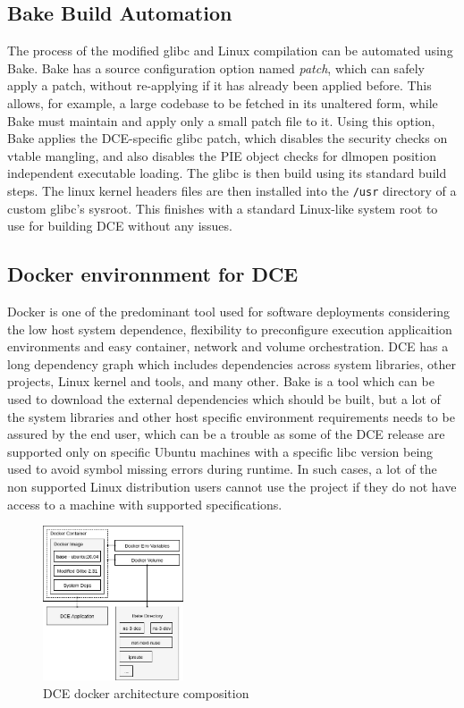 \documentclass{sig-alternate}
\begin{document}
\subsection{Bake Build Automation}

The process of the modified glibc and Linux compilation can be automated using Bake.
Bake has a source configuration option named \textit{patch}, which can safely apply a patch, without re-applying if it has already been applied before.  
This allows, for example, a large codebase to be fetched in its unaltered form, while Bake must maintain and apply only a small patch file to it.
Using this option, Bake applies the DCE-specific glibc patch, which disables the security checks on vtable mangling, and also disables the 
PIE object checks for dlmopen position independent executable loading. The glibc is then build using its standard build steps. The linux kernel headers
files are then installed into the \texttt{/usr} directory of a custom glibc's sysroot. This finishes with a standard Linux-like system root to use for building 
DCE without any issues. 


\subsection{Docker environnment for DCE}
Docker is one of the predominant tool used for software deployments considering the low host system dependence, flexibility to preconfigure execution 
applicaition environments and easy container, network and volume orchestration. DCE has a long dependency graph which includes dependencies across 
system libraries, other projects, Linux kernel and tools, and many other. Bake is a tool which can be used to download the external dependencies 
which should be built, but a lot of the system libraries and other host specific environment requirements needs to be assured by the end user, which
can be a trouble as some of the DCE release are supported only on specific Ubuntu machines with a specific libc version being used to avoid symbol 
missing errors during runtime. In such cases, a lot of the non supported Linux distribution users cannot use the project if they do not have access 
to a machine with supported specifications. 


\begin{figure}[!htb]
  \centering
    \includegraphics[width=0.37\textwidth]{figs/docker-architecture.jpg}

  \caption{DCE docker architecture composition}
  \label{fig:docker}
\end{figure}
\end{document}
